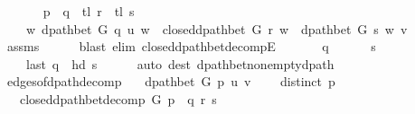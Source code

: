 \begin{isabellebody}
\endisataginvisible
{\isafoldinvisible}%
%
\isadeliminvisible
\isanewline
%
\endisadeliminvisible
%
\isadelimproof
%
\endisadelimproof
%
\isatagproof
{}\isamarkupfalse%
\isanewline
\ \ \isamarkupfalse%
\isanewline
\ \ \ \ {\isachardoublequoteopen}p\ {\isacharequal}{\kern0pt}\ q\ {\isacharat}{\kern0pt}\ tl\ r\ {\isacharat}{\kern0pt}\ tl\ s{\isachardoublequoteclose}\isanewline
\ \ \ \ {\isachardoublequoteopen}{\isasymexists}w{\isachardot}{\kern0pt}\ dpath{\isacharunderscore}{\kern0pt}bet\ G\ q\ u\ w\ {\isasymand}\ closed{\isacharunderscore}{\kern0pt}dpath{\isacharunderscore}{\kern0pt}bet\ G\ r\ w\ {\isasymand}\ dpath{\isacharunderscore}{\kern0pt}bet\ G\ s\ w\ v{\isachardoublequoteclose}\isanewline
\ \ \ \ \isamarkupfalse%
\ assms\isanewline
\ \ \ \ \isamarkupfalse%
\ {\isacharparenleft}{\kern0pt}blast\ elim{\isacharcolon}{\kern0pt}\ closed{\isacharunderscore}{\kern0pt}dpath{\isacharunderscore}{\kern0pt}bet{\isacharunderscore}{\kern0pt}decompE{\isacharunderscore}{\kern0pt}{}{\isacharparenright}{\kern0pt}{\isacharplus}{\kern0pt}\isanewline
\ \ \isamarkupfalse%
\isanewline
\ \ \ \ {\isachardoublequoteopen}q\ {\isasymnoteq}\ {\isacharbrackleft}{\kern0pt}{\isacharbrackright}{\kern0pt}{\isachardoublequoteclose}\isanewline
\ \ \ \ {\isachardoublequoteopen}s\ {\isasymnoteq}\ {\isacharbrackleft}{\kern0pt}{\isacharbrackright}{\kern0pt}{\isachardoublequoteclose}\isanewline
\ \ \ \ {\isachardoublequoteopen}last\ q\ {\isacharequal}{\kern0pt}\ hd\ s{\isachardoublequoteclose}\isanewline
\ \ \ \ \isamarkupfalse%
\ {\isacharparenleft}{\kern0pt}auto\ dest{\isacharcolon}{\kern0pt}\ dpath{\isacharunderscore}{\kern0pt}bet{\isacharunderscore}{\kern0pt}nonempty{\isacharunderscore}{\kern0pt}dpath{\isacharparenleft}{\kern0pt}{}{\isacharminus}{\kern0pt}{}{\isacharparenright}{\kern0pt}{\isacharparenright}{\kern0pt}\isanewline
{}\isamarkupfalse%
%
\endisatagproof
{\isafoldproof}%
%
\isadelimproof
\isanewline
%
\endisadelimproof
%
\isadeliminvisible
\isanewline
%
\endisadeliminvisible
%
\isataginvisible
{}\isamarkupfalse%
\ edges{\isacharunderscore}{\kern0pt}of{\isacharunderscore}{\kern0pt}dpath{\isacharunderscore}{\kern0pt}decomp{\isacharcolon}{\kern0pt}\isanewline
\ \ \ {\isachardoublequoteopen}dpath{\isacharunderscore}{\kern0pt}bet\ G\ p\ u\ v{\isachardoublequoteclose}\isanewline
\ \ \ {\isachardoublequoteopen}{\isasymnot}\ distinct\ p{\isachardoublequoteclose}\isanewline
\ \ \ {\isachardoublequoteopen}closed{\isacharunderscore}{\kern0pt}dpath{\isacharunderscore}{\kern0pt}bet{\isacharunderscore}{\kern0pt}decomp\ G\ p\ {\isacharequal}{\kern0pt}\ {\isacharparenleft}{\kern0pt}q{\isacharcomma}{\kern0pt}\ r{\isacharcomma}{\kern0pt}\ s{\isacharparenright}{\kern0pt}{\isachardoublequoteclose}\isanewline

\end{isabellebody}
